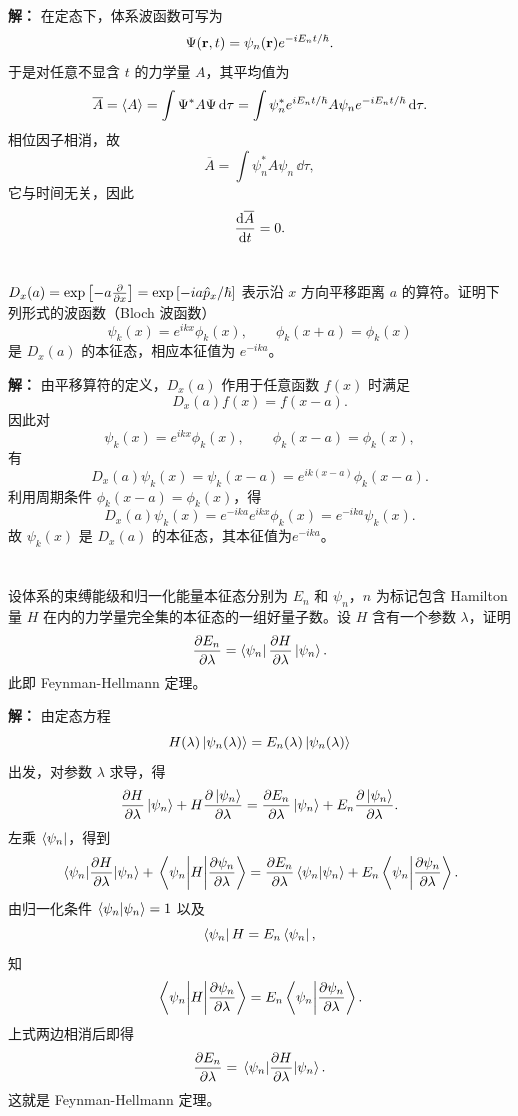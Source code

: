 \documentclass[12pt,a4paper]{article}
\begin{document}
\vspace{0.5cm}
\noindent\textbf{解：}
在定态下，体系波函数可写为
\[
\Psi(\vb{r},t)=\psi_n(\vb{r})e^{-iE_n t/\hbar}.
\]
于是对任意不显含 $t$ 的力学量 $A$，其平均值为
\[
\overline{A}=\expval{A}
=\int \Psi^* A\Psi\,\dd \tau
=\int \psi_n^* e^{iE_n t/\hbar} A \psi_n e^{-iE_n t/\hbar}\,\dd \tau.
\]
相位因子相消，故
\[
\overline{A}=\int \psi_n^* A\psi_n\,\dd \tau,
\]
它与时间无关，因此
\[
\dv{\overline{A}}{t}=0.
\]

\section{}

$D_x(a)=\exp\left[-a\pdv{}{x}\right]=\exp\left[-ia\hat{p}_x/\hbar\right]$
表示沿 $x$ 方向平移距离 $a$ 的算符。证明下列形式的波函数（Bloch 波函数）
\[
\psi_k(x)=e^{ikx}\phi_k(x),\qquad \phi_k(x+a)=\phi_k(x)
\]
是 $D_x(a)$ 的本征态，相应本征值为 $e^{-ika}$。

\vspace{0.5cm}
\noindent\textbf{解：}
由平移算符的定义，$D_x(a)$ 作用于任意函数 $f(x)$ 时满足
\[
D_x(a)f(x)=f(x-a).
\]
因此对
\[
\psi_k(x)=e^{ikx}\phi_k(x),\qquad \phi_k(x-a)=\phi_k(x),
\]
有
\[
D_x(a)\psi_k(x)=\psi_k(x-a)=e^{ik(x-a)}\phi_k(x-a).
\]
利用周期条件 $\phi_k(x-a)=\phi_k(x)$，得
\[
D_x(a)\psi_k(x)=e^{-ika}e^{ikx}\phi_k(x)=e^{-ika}\psi_k(x).
\]
故 $\psi_k(x)$ 是 $D_x(a)$ 的本征态，其本征值为\(e^{-ika}\)。

\section{}

设体系的束缚能级和归一化能量本征态分别为 $E_n$ 和 $\psi_n$，$n$ 为标记包含 Hamilton 量 $H$ 在内的力学量完全集的本征态的一组好量子数。设 $H$ 含有一个参数 $\lambda$，证明
\[
\pdv{E_n}{\lambda}=\bra{\psi_n}\pdv{H}{\lambda}\ket{\psi_n}.
\]
此即 Feynman-Hellmann 定理。

\vspace{0.5cm}
\noindent\textbf{解：}
由定态方程
\[
H(\lambda)\ket{\psi_n(\lambda)}=E_n(\lambda)\ket{\psi_n(\lambda)}
\]
出发，对参数 $\lambda$ 求导，得
\[
\pdv{H}{\lambda}\ket{\psi_n}+H\pdv{\ket{\psi_n}}{\lambda}
=\pdv{E_n}{\lambda}\ket{\psi_n}+E_n\pdv{\ket{\psi_n}}{\lambda}.
\]
左乘 $\bra{\psi_n}$，得到
\[
\matrixel{\psi_n}{\pdv{H}{\lambda}}{\psi_n}
+\matrixel{\psi_n}{H}{\pdv{\psi_n}{\lambda}}
=\pdv{E_n}{\lambda}\braket{\psi_n}{\psi_n}
+E_n\braket{\psi_n}{\pdv{\psi_n}{\lambda}}.
\]
由归一化条件 $\braket{\psi_n}{\psi_n}=1$ 以及
\[
\bra{\psi_n}H=E_n\bra{\psi_n},
\]
知
\[
\matrixel{\psi_n}{H}{\pdv{\psi_n}{\lambda}}
=E_n\braket{\psi_n}{\pdv{\psi_n}{\lambda}}.
\]
上式两边相消后即得
\[
\pdv{E_n}{\lambda}=\matrixel{\psi_n}{\pdv{H}{\lambda}}{\psi_n}.
\]
这就是 Feynman-Hellmann 定理。
\end{document}
